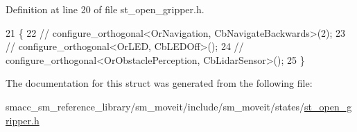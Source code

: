 Definition at line 20 of file st\+\_\+open\+\_\+gripper.\+h.


\begin{DoxyCode}
21    \{
22       \textcolor{comment}{//   configure\_orthogonal<OrNavigation, CbNavigateBackwards>(2);}
23       \textcolor{comment}{//   configure\_orthogonal<OrLED, CbLEDOff>();}
24       \textcolor{comment}{//   configure\_orthogonal<OrObstaclePerception, CbLidarSensor>();}
25    \}
\end{DoxyCode}


The documentation for this struct was generated from the following file\+:\begin{DoxyCompactItemize}
\item 
smacc\+\_\+sm\+\_\+reference\+\_\+library/sm\+\_\+moveit/include/sm\+\_\+moveit/states/\hyperlink{st__open__gripper_8h}{st\+\_\+open\+\_\+gripper.\+h}\end{DoxyCompactItemize}
